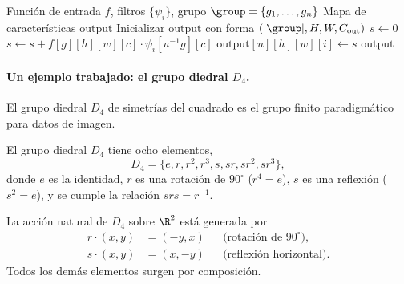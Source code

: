 \begin{algorithm}[h]
\caption{Capa de convoluci\'on de grupo para un grupo finito}
\label{alg:groups:gconv-finite}
\begin{algorithmic}[1]
\Require Funci\'on de entrada $f$, filtros $\{\psi_i\}$, grupo
  $\group = \{g_1, \dots, g_n\}$
\Ensure Mapa de caracter\'isticas $\mathrm{output}$
\State Inicializar $\mathrm{output}$ con forma $(|\group|, H, W, C_{\text{out}})$
      \State $s \leftarrow 0$
          \State $s \leftarrow s + f[g][h][w][c] \cdot \psi_i[u^{-1} g][c]$
        \EndFor
      \EndFor
      \State $\mathrm{output}[u][h][w][i] \leftarrow s$
    \EndFor
  \EndFor
\EndFor
\State \Return $\mathrm{output}$
\end{algorithmic}
\end{algorithm}

\paragraph{Un ejemplo trabajado: el grupo diedral $D_4$.}
El grupo diedral $D_4$ de simetr\'ias del cuadrado es el grupo finito
paradigm\'atico para datos de imagen.

\begin{definition}[El grupo $D_4$]
\label{def:groups:d4}
El grupo diedral $D_4$ tiene ocho elementos,
\begin{equation}
  D_4 = \{e, r, r^2, r^3, s, sr, sr^2, sr^3\},
\end{equation}
donde $e$ es la identidad, $r$ es una rotaci\'on de $90^\circ$ ($r^4 = e$), $s$
es una reflexi\'on ($s^2 = e$), y se cumple la relaci\'on $s r s = r^{-1}$.
\end{definition}

\begin{proposition}
\label{prop:groups:d4-action}
La acci\'on natural de $D_4$ sobre $\R^2$ est\'a generada por
\begin{align}
  r \cdot (x,y) &= (-y, x) && \text{(rotaci\'on de $90^\circ$),} \\
  s \cdot (x,y) &= (x, -y) && \text{(reflexi\'on horizontal).}
\end{align}
Todos los dem\'as elementos surgen por composici\'on.
\end{proposition}

